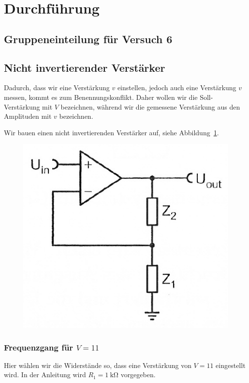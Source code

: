 
\FloatBarrier
\section{Durchführung}

\FloatBarrier
\subsection{Gruppeneinteilung für Versuch 6}

\FloatBarrier
\subsection{Nicht invertierender Verstärker}

Dadurch, dass wir eine Verstärkung $v$ einstellen, jedoch auch eine Verstärkung
$v$ messen, kommt es zum Benennungskonflikt. Daher wollen wir die
Soll-Verstärkung mit $V$ bezeichnen, während wir die gemessene Verstärkung aus
den Amplituden mit $v$ bezeichnen.

Wir bauen einen nicht invertierenden Verstärker auf, siehe
Abbildung~\ref{fig:5_6-4}. 

\begin{figure}[htbp]
	\centering
	\includegraphics[width=.4\linewidth]{Anleitung/5_6-4.png}
	\caption{%
		\cite[Abbildung~5/6.4]{physik313-Anleitung}
	}
	\label{fig:5_6-4}
\end{figure}

\subsubsection{Frequenzgang für $V = 11$}

Hier wählen wir die Widerstände so, dass eine Verstärkung von $V = 11$
eingestellt wird. In der Anleitung wird $R_1 = \SI{1}{\kilo\ohm}$ vorgegeben.

